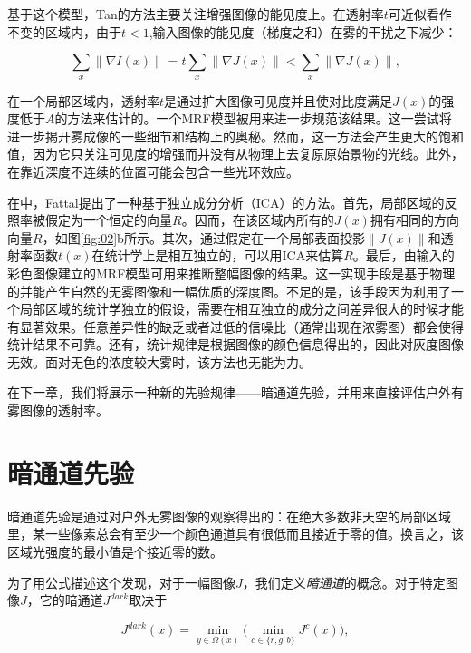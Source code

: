 \documentclass{ctexart}
\begin{document}
基于这个模型，Tan的方法\cite{Tan2008}主要关注增强图像的能见度上。在透射率$t$可近似看作不变的区域内，由于$t<1$,输入图像的能见度（梯度之和）在雾的干扰之下减少：

\begin{equation}\label{equ:4}
	\sum_x \| \nabla I(x) \| = t \sum_x \| \nabla J(x) \| < \sum_x \| \nabla J(x) \|,
\end{equation}

在一个局部区域内，透射率$t$是通过扩大图像可见度并且使对比度满足$J(x)$的强度低于$A$的方法来估计的。一个MRF模型被用来进一步规范该结果。这一尝试将进一步揭开雾成像的一些细节和结构上的奥秘。然而，这一方法会产生更大的饱和值，因为它只关注可见度的增强而并没有从物理上去复原原始景物的光线。此外，在靠近深度不连续的位置可能会包含一些光环效应。\par

在\cite{Fattal2008}中，Fattal提出了一种基于独立成分分析（ICA）的方法。首先，局部区域的反照率被假定为一个恒定的向量$R$。因而，在该区域内所有的$J(x)$拥有相同的方向向量$R$，如图\ref{fig:02}b所示。其次，通过假定在一个局部表面投影$\|J(x)\|$和透射率函数$t(x)$在统计学上是相互独立的，可以用ICA来估算$R$。最后，由输入的彩色图像建立的MRF模型可用来推断整幅图像的结果。这一实现手段是基于物理的并能产生自然的无雾图像和一幅优质的深度图。不足的是，该手段因为利用了一个局部区域的统计学独立的假设，需要在相互独立的成分之间差异很大的时候才能有显著效果。任意差异性的缺乏或者过低的信噪比（通常出现在浓雾图）都会使得统计结果不可靠。还有，统计规律是根据图像的颜色信息得出的，因此对灰度图像无效。面对无色的浓度较大雾时，该方法也无能为力。\par

在下一章，我们将展示一种新的先验规律——暗通道先验，并用来直接评估户外有雾图像的透射率。\par

\section{暗通道先验}
暗通道先验是通过对户外无雾图像的观察得出的：在绝大多数非天空的局部区域里，某一些像素总会有至少一个颜色通道具有很低而且接近于零的值。换言之，该区域光强度的最小值是个接近零的数。\par

为了用公式描述这个发现，对于一幅图像$J$，我们定义\emph{暗通道}的概念。对于特定图像$J$，它的暗通道$J^{dark}$取决于

\begin{equation}\label{equ:5}
	J^{dark}(x) = \min_{y \in \Omega(x)}\Big(\min_{c \in \{ r, g, b\}} J^c(x)\Big),
\end{equation}
\end{document}
